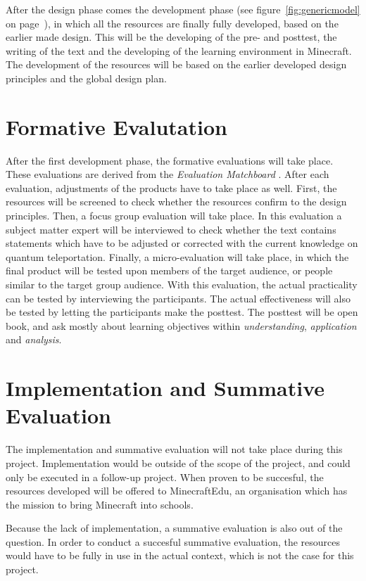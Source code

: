 \documentclass[12pt]{report} %
\begin{document}
After the design phase comes the development phase \cite{genericmodel} (see figure~\ref{fig:genericmodel} on page~\pageref{fig:genericmodel}), in which all the resources are finally fully developed, based on the earlier made design. This will be the developing of the pre- and posttest, the writing of the text and the developing of the learning environment in Minecraft. The development of the resources will be based on the earlier developed design principles and the global design plan.

\section{Formative Evalutation}

After the first development phase, the formative evaluations will take place. These evaluations are derived from the \emph{Evaluation Matchboard} \cite{evamatchboard}. After each evaluation, adjustments of the products have to take place as well. First, the resources will be screened to check whether the resources confirm to the design principles. Then, a focus group evaluation will take place. In this evaluation a subject matter expert will be interviewed to check whether the text contains statements which have to be adjusted or corrected with the current knowledge on quantum teleportation. Finally, a micro-evaluation will take place, in which the final product will be tested upon members of the target audience, or people similar to the target group audience. With this evaluation, the actual practicality can be tested by interviewing the participants. The actual effectiveness will also be tested by letting the participants make the posttest. The posttest will be open book, and ask mostly about learning objectives within \emph{understanding}, \emph{application} and \emph{analysis}.

\section{Implementation and Summative Evaluation}

The implementation and summative evaluation will not take place during this project. Implementation would be outside of the scope of the project, and could only be executed in a follow-up project. When proven to be succesful, the resources developed will be offered to MinecraftEdu, an organisation which has the mission to bring Minecraft into schools.

Because the lack of implementation, a summative evaluation is also out of the question. In order to conduct a succesful summative evaluation, the resources would have to be fully in use in the actual context, which is not the case for this project.
\end{document}
